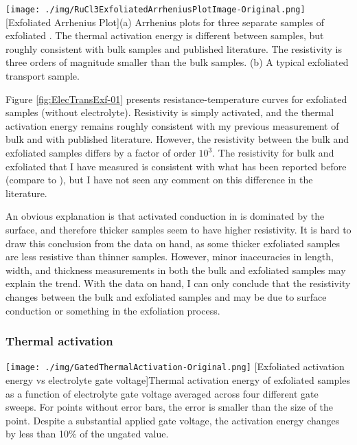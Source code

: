 \begin{centering}
\texttt{[image: ./img/RuCl3ExfoliatedArrheniusPlotImage-Original.png]}
  \captionsetup{width=0.75\textwidth}
  [Exfoliated \rucl Arrhenius Plot]{(a) Arrhenius plots for three separate samples of exfoliated \ruclnospace . The thermal activation energy is different between samples, but roughly consistent with bulk samples and published literature. The resistivity is three orders of magnitude smaller than the bulk samples. (b) A typical exfoliated \rucl transport sample.} 
  \label{fig:ElecTransExf-01}
\end{centering}

Figure \ref{fig:ElecTransExf-01} presents resistance-temperature curves for exfoliated \rucl samples (without electrolyte). Resistivity is simply activated, and the thermal activation energy remains roughly consistent with my previous measurement of bulk \rucl and with published literature. However, the resistivity between the bulk and exfoliated samples differs by a factor of order $10^3$. The resistivity for bulk and exfoliated \rucl that I have measured is consistent with what has been reported before (compare \cite{Rojas1983} to \cite{Mashhadi2018}), but I have not seen any comment on this difference in the literature.

An obvious explanation is that activated conduction in \rucl is dominated by the surface, and therefore thicker samples seem to have higher resistivity. It is hard to draw this conclusion from the data on hand, as some thicker exfoliated samples are less resistive than thinner samples. However, minor inaccuracies in length, width, and thickness measurements in both the bulk and exfoliated samples may explain the trend. With the data on hand, I can only conclude that the resistivity changes between the bulk and exfoliated samples and may be due to surface conduction or something in the exfoliation process.

\subsubsection{Thermal activation}

\begin{centering}
\texttt{[image: ./img/GatedThermalActivation-Original.png]}
  \captionsetup{width=0.75\textwidth}
  [Exfoliated \rucl activation energy vs electrolyte gate voltage]{Thermal activation energy of exfoliated \rucl samples as a function of electrolyte gate voltage averaged across four different gate sweeps. For points without error bars, the error is smaller than the size of the point. Despite a substantial applied gate voltage, the activation energy changes by less than 10\% of the ungated value.} 
  \label{fig:ElecTransExf-02}
\end{centering}

